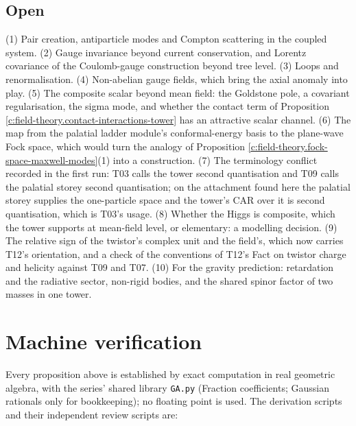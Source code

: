 \documentclass[11pt]{article}
\theoremstyle{definition}
\theoremstyle{plain}
\begin{document}
\subsection*{Open}
\label{c:note.field-theory.setting-open}
(1) Pair creation, antiparticle modes and Compton scattering in the coupled system. (2) Gauge invariance beyond current conservation, and Lorentz covariance of the Coulomb-gauge construction beyond tree level. (3) Loops and renormalisation. (4) Non-abelian gauge fields, which bring the axial anomaly into play. (5) The composite scalar beyond mean field: the Goldstone pole, a covariant regularisation, the sigma mode, and whether the contact term of Proposition \ref{c:field-theory.contact-interactions-tower} has an attractive scalar channel. (6) The map from the palatial ladder module's conformal-energy basis to the plane-wave Fock space, which would turn the analogy of Proposition \ref{c:field-theory.fock-space-maxwell-modes}(1) into a construction. (7) The terminology conflict recorded in the first run: T03 calls the tower second quantisation and T09 calls the palatial storey second quantisation; on the attachment found here the palatial storey supplies the one-particle space and the tower's CAR over it is second quantisation, which is T03's usage. (8) Whether the Higgs is composite, which the tower supports at mean-field level, or elementary: a modelling decision. (9) The relative sign of the twistor's complex unit and the field's, which now carries T12's orientation, and a check of the conventions of T12's Fact on twistor charge and helicity against T09 and T07. (10) For the gravity prediction: retardation and the radiative sector, non-rigid bodies, and the shared spinor factor of two masses in one tower.

\section{Machine verification}

\label{c:note.field-theory.setting-machine-verification}
Every proposition above is established by exact computation in real geometric algebra, with the series' shared library \texttt{GA.py} (Fraction coefficients; Gaussian rationals only for bookkeeping); no floating point is used. The derivation scripts and their independent review scripts are:
\end{document}
